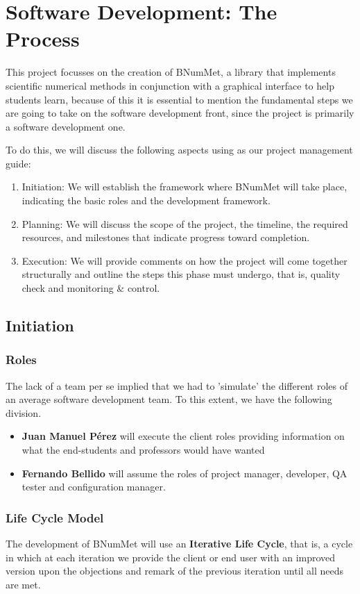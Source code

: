 \chapter{Software Development: The Process}
This project focusses on the creation of BNumMet, a library that implements scientific numerical methods in conjunction with a graphical interface to help students learn, because of this it is essential to mention the fundamental steps we are going to take on the software development front, since the project is primarily a software development one. 

To do this, we will discuss the following aspects using \cite{PMBOK2013} as our project management guide:
\begin{enumerate}
    \item Initiation: We will establish the framework where BNumMet will take place, indicating the basic roles and the development framework.
    \item Planning: We will discuss the scope of the project, the timeline, the required resources, and milestones that indicate progress toward completion.
    \item Execution: We will provide comments on how the project will come together structurally and outline the steps this phase must undergo, that is, quality check and monitoring \& control.
\end{enumerate}


\section{Initiation}
\subsection{Roles}
The lack of a team per se implied that we had to 'simulate' the different roles of an average software development team.
To this extent, we have the following division.
\begin{itemize}
    \item \textbf{Juan Manuel Pérez} will execute the client roles providing information on what the end-students and professors would have wanted
    \item \textbf{Fernando Bellido} will assume the roles of project manager, developer, QA tester and configuration manager.
\end{itemize}

\subsection{Life Cycle Model}
The development of BNumMet will use an \textbf{Iterative Life Cycle}, that is, a cycle in which at each iteration we provide the client or end user with an improved version upon the objections and remark of the previous iteration until all needs are met.

